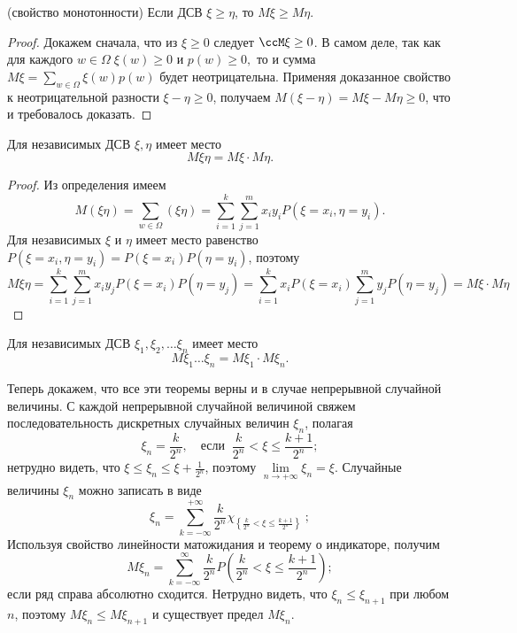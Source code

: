 \begin{thm}(свойство монотонности) Если ДСВ $\xi\ge\eta$, то $M\xi\ge M\eta$.
\end{thm}
\begin{proof}
Докажем сначала, что из $\xi \ge 0$ следует $\ccM\xi\ge0$. В самом деле, так как для каждого $w\in\Omega\; \xi(w)\ge0$ и $p(w)\ge0,$ то и сумма $M\xi=\sum\limits_{w\in\Omega}\xi(w)p(w)$ будет неотрицательна. Применяя доказанное свойство к неотрицательной разности $\xi-\eta\ge0$, получаем $M(\xi-\eta)=M\xi-M\eta\ge0$, что и требовалось доказать.
\end{proof}

\begin{thm}
Для независимых ДСВ $\xi,\eta$ имеет место
$$
M \xi\eta=M\xi\cdot M\eta.
$$
\end{thm}
\begin{proof}
Из определения имеем
$$
M (\xi\eta)=\sum\limits_{w\in\Omega}(\xi\eta)=\sum\limits_{i=1}^{k}\sum\limits^{m}_{j=1}x_i y_i P(\xi=x_i, \eta=y_i).
$$
Для независимых $\xi$ и $\eta$ имеет место равенство $P(\xi=x_i, \eta=y_i)=P(\xi=x_i)P(\eta=y_i)$, поэтому 
$$
M\xi\eta=\sum\limits_{i=1}^{k}\sum\limits^{m}_{j=1}x_i y_j P(\xi=x_i)P( \eta=y_j)=\sum\limits_{i=1}^{k} x_i P(\xi=x_i)\sum\limits^{m}_{j=1} y_j P( \eta=y_j)=M\xi \cdot M\eta
$$
\end{proof}
\begin{cons}
Для независимых ДСВ $\xi_1,\xi_2,\dots \xi_n$ имеет место
$$
M \xi_1\dots\xi_n=M\xi_1\cdot M\xi_n.
$$
\end{cons}

Теперь докажем, что все эти теоремы верны и в случае непрерывной случайной величины. С каждой непрерывной случайной величиной свяжем последовательность дискретных случайных величин $\xi_n$, полагая 
$$
\xi_n=\frac{k}{2^n}, \quad \text{если} \;\; \frac{k}{2^n}<\xi\le\frac{k+1}{2^n};
$$
нетрудно видеть, что $\xi\le\xi_n\le\xi+\frac{1}{2^n}$, поэтому $\lim\limits_{n\to +\infty}\xi_n=\xi$. Случайные величины $\xi_n$ можно записать в виде
$$
\xi_n = \sum_{k=-\infty}^{+\infty}\frac{k}{2^n} \chi_{\textstyle\left\{ \frac{k}{2^n}<\xi\le\frac{k+1}{2^n}\right\}}\; ;
$$
Используя свойство линейности матожидания и теорему о индикаторе, получим
\begin{equation} \label{teorver11}
M\xi_n=\sum\limits^{\infty}_{k=-\infty} \frac{k}{2^n}P\left(\frac{k}{2^n}<\xi \le\frac{k+1}{2^n}\right);
\end{equation}
если ряд справа абсолютно сходится. Нетрудно видеть, что $\xi_n\le\xi_{n+1}$ при любом $n$, поэтому $M\xi_n\le M\xi_{n+1}$ и существует предел $M\xi_n$.

